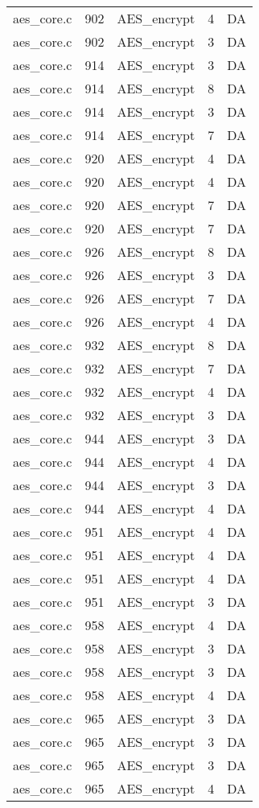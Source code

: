 \begin{table}
\begin{tabular}{clrrr}
aes\_core.c& 902&AES\_encrypt&4 &DA\\
aes\_core.c& 902&AES\_encrypt&3 &DA\\
aes\_core.c& 914&AES\_encrypt&3 &DA\\
aes\_core.c& 914&AES\_encrypt&8 &DA\\
aes\_core.c& 914&AES\_encrypt&3 &DA\\
aes\_core.c& 914&AES\_encrypt&7 &DA\\
aes\_core.c& 920&AES\_encrypt&4 &DA\\
aes\_core.c& 920&AES\_encrypt&4 &DA\\
aes\_core.c& 920&AES\_encrypt&7 &DA\\
aes\_core.c& 920&AES\_encrypt&7 &DA\\
aes\_core.c& 926&AES\_encrypt&8 &DA\\
aes\_core.c& 926&AES\_encrypt&3 &DA\\
aes\_core.c& 926&AES\_encrypt&7 &DA\\
aes\_core.c& 926&AES\_encrypt&4 &DA\\
aes\_core.c& 932&AES\_encrypt&8 &DA\\
aes\_core.c& 932&AES\_encrypt&7 &DA\\
aes\_core.c& 932&AES\_encrypt&4 &DA\\
aes\_core.c& 932&AES\_encrypt&3 &DA\\
aes\_core.c& 944&AES\_encrypt&3 &DA\\
aes\_core.c& 944&AES\_encrypt&4 &DA\\
aes\_core.c& 944&AES\_encrypt&3 &DA\\
aes\_core.c& 944&AES\_encrypt&4 &DA\\
aes\_core.c& 951&AES\_encrypt&4 &DA\\
aes\_core.c& 951&AES\_encrypt&4 &DA\\
aes\_core.c& 951&AES\_encrypt&4 &DA\\
aes\_core.c& 951&AES\_encrypt&3 &DA\\
aes\_core.c& 958&AES\_encrypt&4 &DA\\
aes\_core.c& 958&AES\_encrypt&3 &DA\\
aes\_core.c& 958&AES\_encrypt&3 &DA\\
aes\_core.c& 958&AES\_encrypt&4 &DA\\
aes\_core.c& 965&AES\_encrypt&3 &DA\\
aes\_core.c& 965&AES\_encrypt&3 &DA\\
aes\_core.c& 965&AES\_encrypt&3 &DA\\
aes\_core.c& 965&AES\_encrypt&4 &DA\\
\hline
\end{tabular}
\renewcommand{\baselinestretch}{1.0}\selectfont
\end{table}
